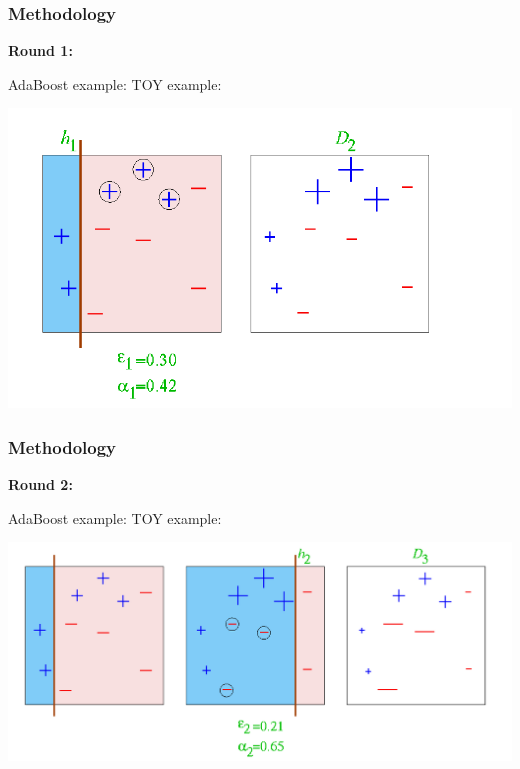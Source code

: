 \documentclass[xcolor={x11names,svgnames,dvipsnames}]{beamer}
\begin{document}
\begin{frame}
	\frametitle{Methodology}
   \small{\textbf{Round 1:}}

	\begin{block}{AdaBoost example: TOY example:}

      \includegraphics[width=1\textwidth, height=0.6\textheight]{round_1.png}
	\end{block}	
\end{frame}

\begin{frame}
	\frametitle{Methodology}
	 \small{\textbf{Round 2:}}\\
		
	\begin{block}{AdaBoost example: TOY example:}

      \includegraphics[width=1\textwidth, height=0.6\textheight]{round_2.png}
	\end{block}	
\end{frame}
\end{document}

